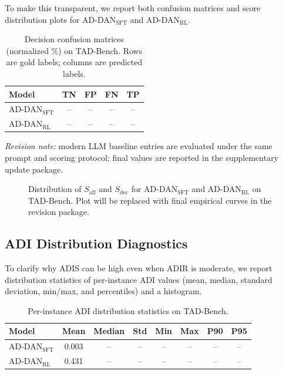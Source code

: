 \documentclass[lettersize,journal]{IEEEtran}
\begin{document}
To make this transparent, we report both confusion matrices and score
distribution plots for AD-DAN$_\mathrm{SFT}$ and AD-DAN$_\mathrm{RL}$.

\begin{table}[!t]
\centering
\caption{Decision confusion matrices (normalized \%) on TAD-Bench.
Rows are gold labels; columns are predicted labels.}
\label{tab:cm_sft_rl}
\renewcommand{\arraystretch}{1.12}
\begin{tabular}{lcccc}
\toprule
\textbf{Model} & \textbf{TN} & \textbf{FP} & \textbf{FN} & \textbf{TP} \\
\midrule
AD-DAN$_\mathrm{SFT}$ & -- & -- & -- & -- \\
AD-DAN$_\mathrm{RL}$  & -- & -- & -- & -- \\
\bottomrule
\end{tabular}
\end{table}

\noindent\textit{Revision note:} modern LLM baseline entries are evaluated
under the same prompt and scoring protocol; final values are reported in the
supplementary update package.

\begin{figure}[!t]
\centering
{}
\caption{Distribution of $S_\mathrm{aff}$ and $S_\mathrm{dec}$ for
AD-DAN$_\mathrm{SFT}$ and AD-DAN$_\mathrm{RL}$ on TAD-Bench.
Plot will be replaced with final empirical curves in the revision package.}
\label{fig:score_dist}
\end{figure}

\subsection{ADI Distribution Diagnostics}
\label{sec:adi_distribution}

To clarify why ADIS can be high even when ADIR is moderate, we report
distribution statistics of per-instance ADI values (mean, median, standard
deviation, min/max, and percentiles) and a histogram.

\begin{table}[!t]
\centering
\caption{Per-instance ADI distribution statistics on TAD-Bench.}
\label{tab:adi_stats}
\renewcommand{\arraystretch}{1.12}
\begin{tabular}{lccccccc}
\toprule
\textbf{Model} & \textbf{Mean} & \textbf{Median} & \textbf{Std} & \textbf{Min} & \textbf{Max} & \textbf{P90} & \textbf{P95} \\
\midrule
AD-DAN$_\mathrm{SFT}$ & 0.003 & -- & -- & -- & -- & -- & -- \\
AD-DAN$_\mathrm{RL}$  & 0.431 & -- & -- & -- & -- & -- & -- \\
\bottomrule
\end{tabular}
\end{table}
\end{document}
